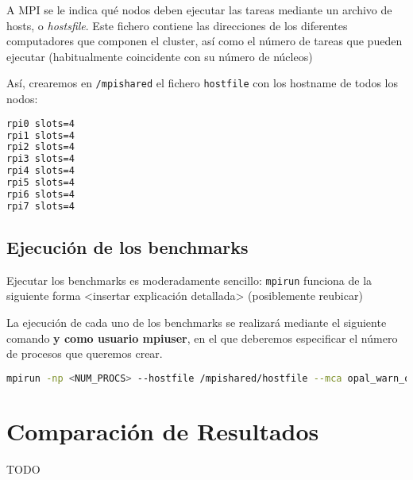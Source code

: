 A MPI se le indica qué nodos deben ejecutar las tareas mediante un archivo de hosts, o \textit{hostsfile}\cite{mpi_hostfile_option}. Este fichero contiene las direcciones de los diferentes computadores que componen el cluster, así como el número de tareas que pueden ejecutar (habitualmente coincidente con su número de núcleos)

Así, crearemos en \texttt{/mpishared} el fichero \texttt{hostfile} con los hostname de todos los nodos:

\begin{lstlisting}[language=bash]
rpi0 slots=4
rpi1 slots=4
rpi2 slots=4
rpi3 slots=4
rpi4 slots=4
rpi5 slots=4
rpi6 slots=4
rpi7 slots=4
\end{lstlisting}

\subsection{Ejecución de los benchmarks}
Ejecutar los benchmarks es moderadamente sencillo: \texttt{mpirun} funciona de la siguiente forma <insertar explicación detallada> (posiblemente reubicar)

La ejecución de cada uno de los benchmarks se realizará mediante el siguiente comando \textbf{y como usuario mpiuser}, en el que deberemos especificar el número de procesos que queremos crear.

\begin{lstlisting}[language=bash]
mpirun -np <NUM_PROCS> --hostfile /mpishared/hostfile --mca opal_warn_on_missing_libcuda 0 /mpishared/NPB3.4.2/NPB3.4-MPI/bin/<KERNEL>.<CLASS>.x
\end{lstlisting}

\section{Comparación de Resultados}
TODO